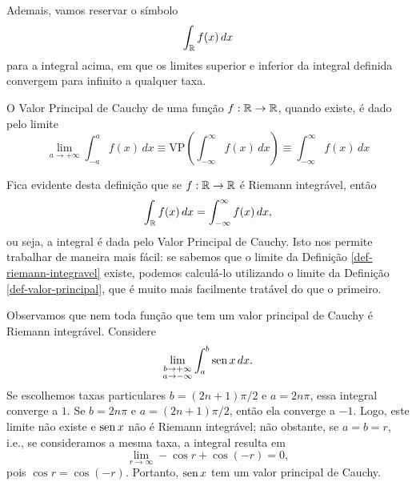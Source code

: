         Ademais, vamos reservar o símbolo
        \begin{equation*}
            \int_{\mathbb{R}} f(x) \, dx
        \end{equation*}
        para a integral acima, em que os limites superior e inferior da integral definida
        convergem para infinito a qualquer taxa.
        \begin{definicao}
        \label{def-valor-principal}
            O Valor Principal de Cauchy de uma função $f:\mathbb{R}\to\mathbb{R}$, quando existe, é dado pelo limite
            \begin{equation*}
                \lim_{a\to +\infty} \int_{-a}^a f(x) \, dx 
                \equiv \text{VP}\left( \int_{-\infty}^\infty f(x) \, dx \right)
                \equiv \int_{-\infty}^\infty f(x) \, dx
            \end{equation*}
        \end{definicao}
        Fica evidente desta definição que se $f:\mathbb{R}\to\mathbb{R}$ é Riemann integrável, então
        \begin{equation*}
            \int_{\mathbb{R}} f(x) \, dx = \int_{-\infty}^\infty f(x) \, dx,
        \end{equation*}
        ou seja, a integral é dada pelo Valor Principal de Cauchy. Isto nos permite trabalhar de
        maneira mais fácil: se sabemos que o limite da Definição \ref{def-riemann-integravel} 
        existe, podemos calculá-lo utilizando o limite da Definição \ref{def-valor-principal}, 
        que é muito mais facilmente tratável do que o primeiro.
        
        Observamos que nem toda função que tem um valor principal de Cauchy é Riemann integrável. Considere
        \begin{equation*}
            \lim_{\substack{b\to +\infty \\ 
                            a\to -\infty}
                 } \int_a^b \operatorname{sen}{x} \, dx. 
        \end{equation*}
        Se escolhemos taxas particulares $b = (2n+1)\pi/2$ e $a = 2n\pi$, essa integral converge a $1$. 
        Se $b = 2n\pi$ e $a = (2n+1)\pi/2$, então ela converge a $-1$. Logo, este limite não existe e 
        $\operatorname{sen}{x}$ não é Riemann integrável; não obstante, se $a = b = r$, i.e., se consideramos a mesma taxa, 
        a integral resulta em
        \begin{equation*}
            \lim_{r \to \infty} - \cos r + \cos(-r) = 0,
        \end{equation*}
        pois $\cos r = \cos(-r)$. Portanto, $\operatorname{sen}{x}$ tem um valor principal de Cauchy.
